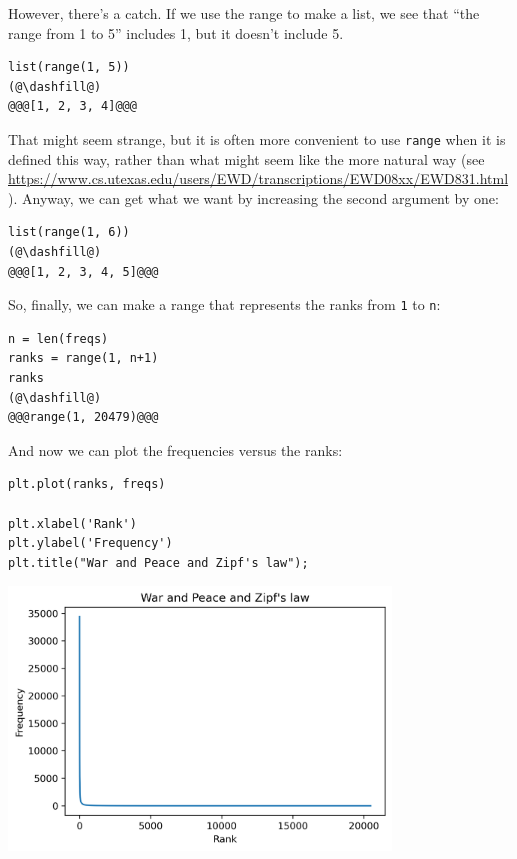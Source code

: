 However, there's a catch. If we use the range to make a list, we see
that ``the range from 1 to 5'' includes 1, but it doesn't include 5.

\begin{lstlisting}[]
list(range(1, 5))
(@\dashfill@)
@@@[1, 2, 3, 4]@@@
\end{lstlisting}

That might seem strange, but it is often more convenient to use
\passthrough{\lstinline!range!} when it is defined this way, rather than
what might seem like the more natural way (see
\url{https://www.cs.utexas.edu/users/EWD/transcriptions/EWD08xx/EWD831.html}).
Anyway, we can get what we want by increasing the second argument by
one:

\begin{lstlisting}[]
list(range(1, 6))
(@\dashfill@)
@@@[1, 2, 3, 4, 5]@@@
\end{lstlisting}

So, finally, we can make a range that represents the ranks from
\passthrough{\lstinline!1!} to \passthrough{\lstinline!n!}:

\begin{lstlisting}[]
n = len(freqs)
ranks = range(1, n+1)
ranks
(@\dashfill@)
@@@range(1, 20479)@@@
\end{lstlisting}

And now we can plot the frequencies versus the ranks:

\begin{lstlisting}[]
plt.plot(ranks, freqs)

plt.xlabel('Rank')
plt.ylabel('Frequency')
plt.title("War and Peace and Zipf's law");
\end{lstlisting}

\begin{center}
\includegraphics[width=4in]{06_plotting_files/06_plotting_74_0.png}
\end{center}


